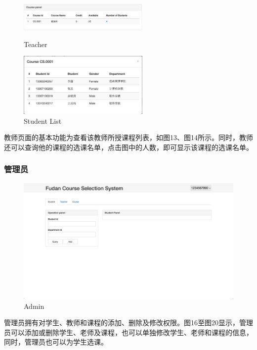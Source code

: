 \documentclass[a4paper, 11pt, nofonts, nocap, fancyhdr]{ctexart}
\begin{document}
	\begin{figure}[h]
		\begin{minipage}{0.5\textwidth}
			\centering
			\includegraphics[width=2.5in]{teacher}
			\caption{Teacher}
		\end{minipage}%
		\begin{minipage}{0.5\textwidth}
			\centering
			\includegraphics[width=2.5in]{adteacou}
			\caption{Student List}
		\end{minipage}
	\end{figure}

	教师页面的基本功能为查看该教师所授课程列表，如图13、图14所示。同时，教师还可以查询他的课程的选课名单，点击图中的人数，即可显示该课程的选课名单。

\newpage
\subsubsection{管理员}

	\begin{figure}[h]
		\centering
		\includegraphics[width=6in]{adover}
		\caption{Admin}
	\end{figure}

	管理员拥有对学生、教师和课程的添加、删除及修改权限。图16至图20显示，管理员可以添加或删除学生、老师及课程，也可以单独修改学生、老师和课程的信息，同时，管理员也可以为学生选课。
\end{document}
